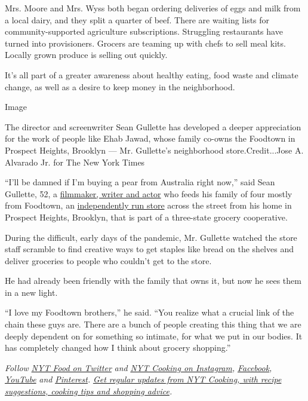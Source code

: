 Mrs. Moore and Mrs. Wyss both began ordering deliveries of eggs and milk
from a local dairy, and they split a quarter of beef. There are waiting
lists for community-supported agriculture subscriptions. Struggling
restaurants have turned into provisioners. Grocers are teaming up with
chefs to sell meal kits. Locally grown produce is selling out quickly.

It's all part of a greater awareness about healthy eating, food waste
and climate change, as well as a desire to keep money in the
neighborhood.

Image

The director and screenwriter Sean Gullette has developed a deeper
appreciation for the work of people like Ehab Jawad, whose family
co-owns the Foodtown in Prospect Heights, Brooklyn --- Mr. Gullette's
neighborhood store.Credit...Jose A. Alvarado Jr. for The New York Times

``I'll be damned if I'm buying a pear from Australia right now,'' said
Sean Gullette, 52, a
\href{https://www.imdb.com/name/nm0347797/}{filmmaker, writer and actor}
who feeds his family of four mostly from Foodtown, an
\href{https://www.foodtown.com/stores/foodtown-of-prospect-heights}{independently
run store} across the street from his home in Prospect Heights,
Brooklyn, that is part of a three-state grocery cooperative.

During the difficult, early days of the pandemic, Mr. Gullette watched
the store staff scramble to find creative ways to get staples like bread
on the shelves and deliver groceries to people who couldn't get to the
store.

He had already been friendly with the family that owns it, but now he
sees them in a new light.

``I love my Foodtown brothers,'' he said. ``You realize what a crucial
link of the chain these guys are. There are a bunch of people creating
this thing that we are deeply dependent on for something so intimate,
for what we put in our bodies. It has completely changed how I think
about grocery shopping.''

\emph{Follow} \href{https://twitter.com/nytfood}{\emph{NYT Food on
Twitter}} \emph{and}
\href{https://www.instagram.com/nytcooking/}{\emph{NYT Cooking on
Instagram}}\emph{,}
\href{https://www.facebookcorewwwi.onion/nytcooking/}{\emph{Facebook}}\emph{,}
\href{https://www.youtube.com/nytcooking}{\emph{YouTube}} \emph{and}
\href{https://www.pinterest.com/nytcooking/}{\emph{Pinterest}}\emph{.}
\href{https://www.nytimes3xbfgragh.onion/newsletters/cooking}{\emph{Get
regular updates from NYT Cooking, with recipe suggestions, cooking tips
and shopping advice}}\emph{.}

